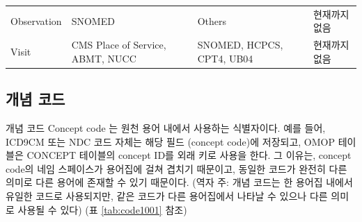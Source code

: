 \documentclass[10.5pt]{book}
\theoremstyle{definition}
\theoremstyle{definition}
\theoremstyle{definition}
\theoremstyle{remark}
\begin{document}
\begin{longtable}[]{@{}llll@{}}
\begin{minipage}[t]{0.12\columnwidth}\raggedright\strut
Observation\strut
\end{minipage} & \begin{minipage}[t]{0.21\columnwidth}\raggedright\strut
SNOMED\strut
\end{minipage} & \begin{minipage}[t]{0.21\columnwidth}\raggedright\strut
Others\strut
\end{minipage} & \begin{minipage}[t]{0.18\columnwidth}\raggedright\strut
현재까지 없음\strut
\end{minipage}\tabularnewline
\begin{minipage}[t]{0.12\columnwidth}\raggedright\strut
Visit\strut
\end{minipage} & \begin{minipage}[t]{0.21\columnwidth}\raggedright\strut
CMS Place of Service, ABMT, NUCC\strut
\end{minipage} & \begin{minipage}[t]{0.21\columnwidth}\raggedright\strut
SNOMED, HCPCS, CPT4, UB04\strut
\end{minipage} & \begin{minipage}[t]{0.18\columnwidth}\raggedright\strut
현재까지 없음\strut
\end{minipage}\tabularnewline
\bottomrule
\end{longtable}

\subsection{개념 코드}\label{-}

개념 코드 Concept code 는 원천 용어 내에서 사용하는 식별자이다. 예를
들어, ICD9CM 또는 NDC 코드 자체는 해당 필드 (concept code)에 저장되고,
OMOP 테이블은 CONCEPT 테이블의 concept ID를 외래 키로 사용을 한다. 그
이유는, concept code의 네임 스페이스가 용어집에 걸쳐 겹치기 때문이고,
동일한 코드가 완전히 다른 의미로 다른 용어에 존재할 수 있기 때문이다.
(역자 주: 개념 코드는 한 용어집 내에서 유일한 코드로 사용되지만, 같은
코드가 다른 용어집에서 나타날 수 있으나 다른 의미로 사용될 수 있다) (표
\ref{tab:code1001} 참조) 
\end{document}
